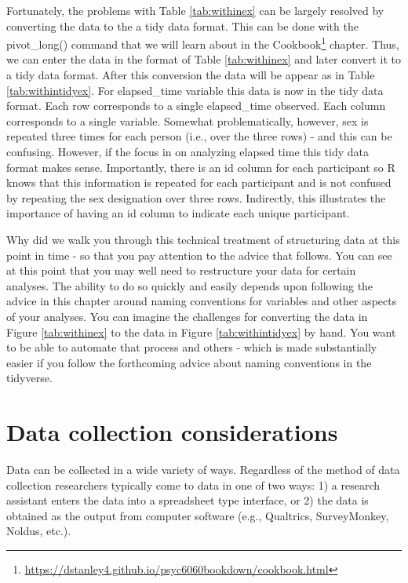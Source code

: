 \documentclass[
]{krantz}
\renewcommand{\href}[2]{#2\footnote{\url{#1}}}
\begin{document}
\newpage

Fortunately, the problems with Table \ref{tab:withinex} can be largely resolved by converting the data to the a tidy data format. This can be done with the pivot\_long() command that we will learn about in the \href{https://dstanley4.github.io/psyc6060bookdown/cookbook.html}{Cookbook} chapter. Thus, we can enter the data in the format of Table \ref{tab:withinex} and later convert it to a tidy data format. After this conversion the data will be appear as in Table \ref{tab:withintidyex}. For elapsed\_time variable this data is now in the tidy data format. Each row corresponds to a single elapsed\_time observed. Each column corresponds to a single variable. Somewhat problematically, however, sex is repeated three times for each person (i.e., over the three rows) - and this can be confusing. However, if the focus in on analyzing elapsed time this tidy data format makes sense. Importantly, there is an id column for each participant so R knows that this information is repeated for each participant and is not confused by repeating the sex designation over three rows. Indirectly, this illustrates the importance of having an id column to indicate each unique participant.

Why did we walk you through this technical treatment of structuring data at this point in time - so that you pay attention to the advice that follows. You can see at this point that you may well need to restructure your data for certain analyses. The ability to do so quickly and easily depends upon following the advice in this chapter around naming conventions for variables and other aspects of your analyses. You can imagine the challenges for converting the data in Figure \ref{tab:withinex} to the data in Figure \ref{tab:withintidyex} by hand. You want to be able to automate that process and others - which is made substantially easier if you follow the forthcoming advice about naming conventions in the tidyverse.

\hypertarget{data-collection-considerations}{%
\section{Data collection considerations}\label{data-collection-considerations}}

Data can be collected in a wide variety of ways. Regardless of the method of data collection researchers typically come to data in one of two ways: 1) a research assistant enters the data into a spreadsheet type interface, or 2) the data is obtained as the output from computer software (e.g., Qualtrics, SurveyMonkey, Noldus, etc.).
\end{document}
